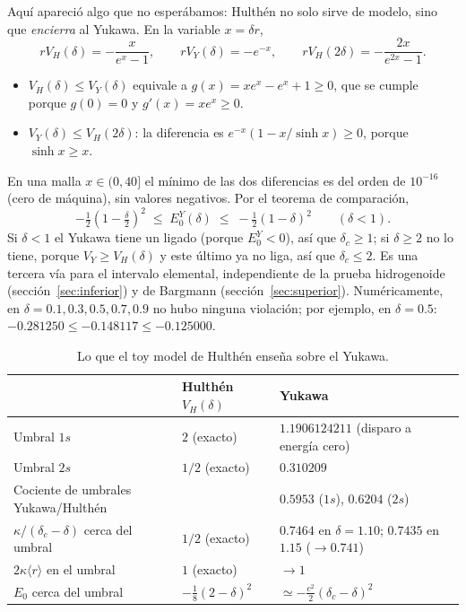 \documentclass[11pt]{article}
\newcommand{\dc}{\delta_c}
\begin{document}
Aquí apareció algo que no esperábamos: Hulthén no solo sirve de modelo, sino que \emph{encierra} al Yukawa. En la variable $x=\delta r$,
\[
rV_H(\delta)=-\frac{x}{e^x-1},\qquad rV_Y(\delta)=-e^{-x},\qquad rV_H(2\delta)=-\frac{2x}{e^{2x}-1}.
\]
\begin{itemize}
\item $V_H(\delta)\le V_Y(\delta)$ equivale a $g(x)=xe^x-e^x+1\ge0$, que se cumple porque $g(0)=0$ y $g'(x)=xe^x\ge0$.
\item $V_Y(\delta)\le V_H(2\delta)$: la diferencia es $e^{-x}(1-x/\sinh x)\ge0$, porque $\sinh x\ge x$.
\end{itemize}
En una malla $x\in(0,40]$ el mínimo de las dos diferencias es del orden de $10^{-16}$ (cero de máquina), sin valores negativos. Por el teorema de comparación,
\[
-\tfrac12\left(1-\tfrac{\delta}{2}\right)^2\;\le\;E_0^Y(\delta)\;\le\;-\tfrac12(1-\delta)^2\qquad(\delta<1).
\]
Si $\delta<1$ el Yukawa tiene un ligado (porque $E_0^Y<0$), así que $\dc\ge1$; si $\delta\ge2$ no lo tiene, porque $V_Y\ge V_H(\delta)$ y este último ya no liga, así que $\dc\le2$. Es una tercera vía para el intervalo elemental, independiente de la prueba hidrogenoide (sección~\ref{sec:inferior}) y de Bargmann (sección~\ref{sec:superior}). Numéricamente, en $\delta=0.1,0.3,0.5,0.7,0.9$ no hubo ninguna violación; por ejemplo, en $\delta=0.5$: $-0.281250\le-0.148117\le-0.125000$.

\begin{table}[H]
\centering
\small
\caption{Lo que el toy model de Hulthén enseña sobre el Yukawa.}
\begin{tabular}{@{}lll@{}}
\toprule
 & \textbf{Hulthén $V_H(\delta)$} & \textbf{Yukawa}\\
\midrule
Umbral $1s$ & $2$ (exacto) & $1.1906124211$ (disparo a energía cero)\\
Umbral $2s$ & $1/2$ (exacto) & $0.310209$\\
Cociente de umbrales Yukawa/Hulthén & & $0.5953$ ($1s$), $0.6204$ ($2s$)\\
$\kappa/(\dc-\delta)$ cerca del umbral & $1/2$ (exacto) & $0.7464$ en $\delta=1.10$; $0.7435$ en $1.15$ ($\to0.741$)\\
$2\kappa\langle r\rangle$ en el umbral & $1$ (exacto) & $\to1$\\
$E_0$ cerca del umbral & $-\tfrac18(2-\delta)^2$ & $\simeq-\tfrac{c^2}{2}(\dc-\delta)^2$\\
\bottomrule
\end{tabular}
\end{table}
\end{document}
